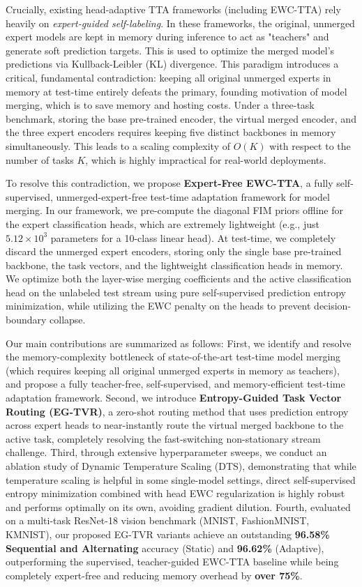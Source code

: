 \documentclass{article}
\theoremstyle{plain}
\theoremstyle{definition}
\theoremstyle{remark}
\begin{document}
Crucially, existing head-adaptive TTA frameworks (including EWC-TTA) rely heavily on \textit{expert-guided self-labeling}. In these frameworks, the original, unmerged expert models are kept in memory during inference to act as "teachers" and generate soft prediction targets. This is used to optimize the merged model's predictions via Kullback-Leibler (KL) divergence. This paradigm introduces a critical, fundamental contradiction: keeping all original unmerged experts in memory at test-time entirely defeats the primary, founding motivation of model merging, which is to save memory and hosting costs. Under a three-task benchmark, storing the base pre-trained encoder, the virtual merged encoder, and the three expert encoders requires keeping five distinct backbones in memory simultaneously. This leads to a scaling complexity of $O(K)$ with respect to the number of tasks $K$, which is highly impractical for real-world deployments.

To resolve this contradiction, we propose \textbf{Expert-Free EWC-TTA}, a fully self-supervised, unmerged-expert-free test-time adaptation framework for model merging. In our framework, we pre-compute the diagonal FIM priors offline for the expert classification heads, which are extremely lightweight (e.g., just $5.12 \times 10^3$ parameters for a 10-class linear head). At test-time, we completely discard the unmerged expert encoders, storing only the single base pre-trained backbone, the task vectors, and the lightweight classification heads in memory. We optimize both the layer-wise merging coefficients and the active classification head on the unlabeled test stream using pure self-supervised prediction entropy minimization, while utilizing the EWC penalty on the heads to prevent decision-boundary collapse.

Our main contributions are summarized as follows: First, we identify and resolve the memory-complexity bottleneck of state-of-the-art test-time model merging (which requires keeping all original unmerged experts in memory as teachers), and propose a fully teacher-free, self-supervised, and memory-efficient test-time adaptation framework. Second, we introduce \textbf{Entropy-Guided Task Vector Routing (EG-TVR)}, a zero-shot routing method that uses prediction entropy across expert heads to near-instantly route the virtual merged backbone to the active task, completely resolving the fast-switching non-stationary stream challenge. Third, through extensive hyperparameter sweeps, we conduct an ablation study of Dynamic Temperature Scaling (DTS), demonstrating that while temperature scaling is helpful in some single-model settings, direct self-supervised entropy minimization combined with head EWC regularization is highly robust and performs optimally on its own, avoiding gradient dilution. Fourth, evaluated on a multi-task ResNet-18 vision benchmark (MNIST, FashionMNIST, KMNIST), our proposed EG-TVR variants achieve an outstanding \textbf{96.58\% Sequential and Alternating} accuracy (Static) and \textbf{96.62\%} (Adaptive), outperforming the supervised, teacher-guided EWC-TTA baseline while being completely expert-free and reducing memory overhead by \textbf{over 75\%}.
\end{document}
